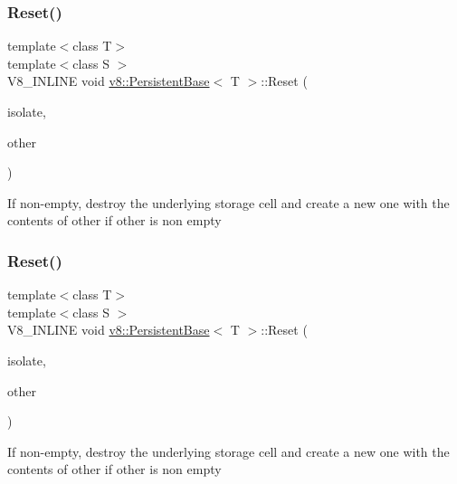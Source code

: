 \subsubsection{\texorpdfstring{Reset()}{Reset()}\hspace{0.1cm}{\footnotesize\ttfamily [2/3]}}
{\footnotesize\ttfamily template$<$class T$>$ \\
template$<$class S $>$ \\
V8\+\_\+\+I\+N\+L\+I\+NE void \mbox{\hyperlink{classv8_1_1PersistentBase}{v8\+::\+Persistent\+Base}}$<$ T $>$\+::Reset (\begin{DoxyParamCaption}\item[{Isolate $\ast$}]{isolate,  }\item[{const \mbox{\hyperlink{classv8_1_1Local}{Local}}$<$ S $>$ \&}]{other }\end{DoxyParamCaption})}

If non-\/empty, destroy the underlying storage cell and create a new one with the contents of other if other is non empty \mbox{\label{classv8_1_1PersistentBase_af6b8f929b0cbaa83341df48ca3b03ef5}} 
\subsubsection{\texorpdfstring{Reset()}{Reset()}\hspace{0.1cm}{\footnotesize\ttfamily [3/3]}}
{\footnotesize\ttfamily template$<$class T$>$ \\
template$<$class S $>$ \\
V8\+\_\+\+I\+N\+L\+I\+NE void \mbox{\hyperlink{classv8_1_1PersistentBase}{v8\+::\+Persistent\+Base}}$<$ T $>$\+::Reset (\begin{DoxyParamCaption}\item[{Isolate $\ast$}]{isolate,  }\item[{const \mbox{\hyperlink{classv8_1_1PersistentBase}{Persistent\+Base}}$<$ S $>$ \&}]{other }\end{DoxyParamCaption})}

If non-\/empty, destroy the underlying storage cell and create a new one with the contents of other if other is non empty \mbox{\label{classv8_1_1PersistentBase_aebb8a2c97e219102f613ff3749c956f6}} 
